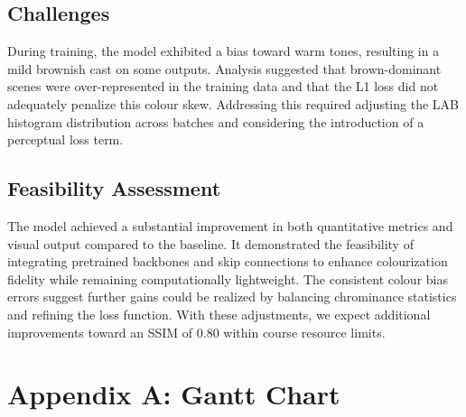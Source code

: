 \documentclass{article} %
\begin{document}
\subsection{Challenges}

During training, the model exhibited a bias toward warm tones, resulting in a mild brownish cast on some outputs. Analysis suggested that brown-dominant scenes were over-represented in the training data and that the L1 loss did not adequately penalize this colour skew. Addressing this required adjusting the LAB histogram distribution across batches and considering the introduction of a perceptual loss term.

\subsection{Feasibility Assessment}

The model achieved a substantial improvement in both quantitative metrics and visual output compared to the baseline. It demonstrated the feasibility of integrating pretrained backbones and skip connections to enhance colourization fidelity while remaining computationally lightweight. The consistent colour bias errors suggest further gains could be realized by balancing chrominance statistics and refining the loss function. With these adjustments, we expect additional improvements toward an SSIM of 0.80 within course resource limits.

\label{last_page}

\newpage



\newpage
\section{Appendix A: Gantt Chart}
\end{document}
